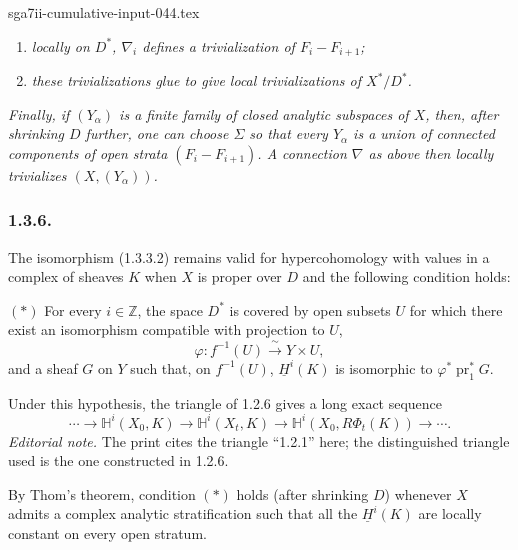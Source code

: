 \begin{filecontents*}{sga7ii-cumulative-input-044.tex}
\begin{enumerate}[label=(\roman*),leftmargin=2.7em]
\item \textit{locally on $D^*$, $\nabla_i$ defines a trivialization
of $F_i-F_{i+1}$;}

\item \textit{these trivializations glue to give local
trivializations of $X^*/D^*$.}
\end{enumerate}

\textit{Finally, if $(Y_\alpha)$ is a finite family of closed
analytic subspaces of $X$, then, after shrinking $D$ further, one can
choose $\Sigma$ so that every $Y_\alpha$ is a union of connected
components of open strata $(F_i-F_{i+1})$.  A connection $\nabla$ as
above then locally trivializes $(X,(Y_\alpha))$.}

\subsubsection*{1.3.6.}
The isomorphism (1.3.3.2) remains valid for hypercohomology with
values in a complex of sheaves $K$ when $X$ is proper over $D$ and
the following condition holds:

\medskip
\noindent $(*)$ For every $i\in\mathbb Z$, the space $D^*$ is
covered by open subsets $U$ for which there exist an isomorphism
compatible with projection to $U$,
\[
\varphi:f^{-1}(U)\xrightarrow{\ \sim\ }Y\times U,
\]
and a sheaf $G$ on $Y$ such that, on $f^{-1}(U)$,
$\underline H^i(K)$ is isomorphic to $\varphi^*\operatorname{pr}_1^*G$.

Under this hypothesis, the triangle of 1.2.6 gives a long exact
sequence
\begin{equation}\tag{1.3.6.1}
\cdots\longrightarrow
\mathbb H^i(X_0,K)\longrightarrow
\mathbb H^i(X_t,K)\longrightarrow
\mathbb H^i(X_0,R\Phi_t(K))\longrightarrow\cdots.
\end{equation}
\noindent\emph{Editorial note.}  The print cites the triangle
``1.2.1'' here; the distinguished triangle used is the one constructed
in 1.2.6.

By Thom's theorem, condition $(*)$ holds (after shrinking $D$) whenever
$X$ admits a complex analytic stratification such that all the
$\underline H^i(K)$ are locally constant on every open stratum.

\end{filecontents*}

